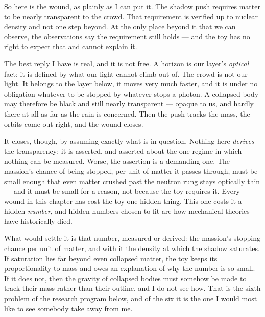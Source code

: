 So here is the wound, as plainly as I can put it. The shadow push requires matter to be nearly transparent to the crowd. That requirement is verified up to nuclear density and not one step beyond. At the only place beyond it that we can observe, the observations say the requirement still holds --- and the toy has no right to expect that and cannot explain it.

The best reply I have is real, and it is not free. A horizon is our layer's \emph{optical} fact: it is defined by what our light cannot climb out of. The crowd is not our light. It belongs to the layer below, it moves very much faster, and it is under no obligation whatever to be stopped by whatever stops a photon. A collapsed body may therefore be black and still nearly transparent --- opaque to us, and hardly there at all as far as the rain is concerned. Then the push tracks the mass, the orbits come out right, and the wound closes.

It closes, though, by assuming exactly what is in question. Nothing here \emph{derives} the transparency; it is asserted, and asserted about the one regime in which nothing can be measured. Worse, the assertion is a demanding one. The massion's chance of being stopped, per unit of matter it passes through, must be small enough that even matter crushed past the neutron rung stays optically thin --- and it must be small for a reason, not because the toy requires it. Every wound in this chapter has cost the toy one hidden thing. This one costs it a hidden \emph{number}, and hidden numbers chosen to fit are how mechanical theories have historically died.

What would settle it is that number, measured or derived: the massion's stopping chance per unit of matter, and with it the density at which the shadow saturates. If saturation lies far beyond even collapsed matter, the toy keeps its proportionality to mass and owes an explanation of why the number is so small. If it does not, then the gravity of collapsed bodies must somehow be made to track their mass rather than their outline, and I do not see how. That is the sixth problem of the research program below, and of the six it is the one I would most like to see somebody take away from me.

